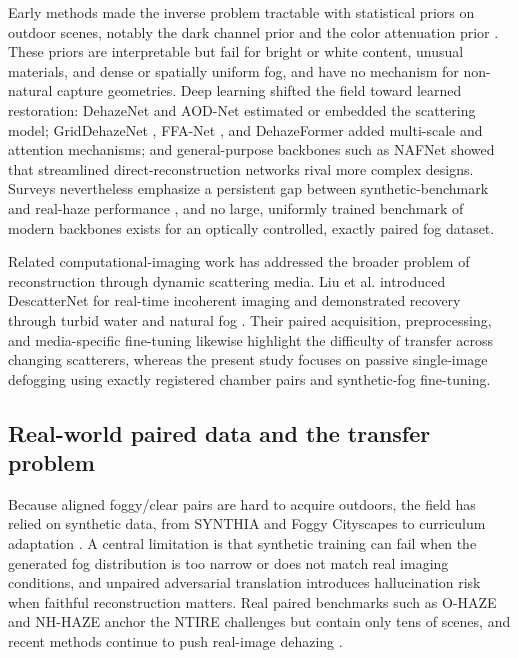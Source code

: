 \documentclass{optica-article}
\begin{document}
Early methods made the inverse problem tractable with statistical
priors on outdoor scenes, notably the dark channel prior
\cite{he2010single} and the color attenuation prior
\cite{zhu2014single}. These priors are interpretable but fail for
bright or white content, unusual materials, and dense or
spatially uniform fog, and have no mechanism for non-natural
capture geometries. Deep learning shifted the field toward learned
restoration: DehazeNet \cite{cai2016dehazenet} and AOD-Net
\cite{li2017aod} estimated or embedded the scattering model;
GridDehazeNet \cite{liu2019griddehazenet}, FFA-Net
\cite{qin2020ffa}, and DehazeFormer \cite{song2023dehazeformer}
added multi-scale and attention mechanisms; and general-purpose
backbones such as NAFNet \cite{chen2022simple} showed that
streamlined direct-reconstruction networks rival more complex
designs. Surveys nevertheless emphasize a persistent gap between
synthetic-benchmark and real-haze performance
\cite{gui2021comprehensive}, and no large, uniformly trained
benchmark of modern backbones exists for an optically controlled,
exactly paired fog dataset.

Related computational-imaging work has addressed the broader problem
of reconstruction through dynamic scattering media. Liu et al.
introduced DescatterNet for real-time incoherent imaging and demonstrated
recovery through turbid water and natural fog
\cite{liu2024dynamic_scattering}. Their paired acquisition, preprocessing,
and media-specific fine-tuning likewise highlight the difficulty of
transfer across changing scatterers, whereas the present study focuses on
passive single-image defogging using exactly registered chamber pairs and
synthetic-fog fine-tuning.
 
\subsection{Real-world paired data and the transfer problem}
 
Because aligned foggy/clear pairs are hard to acquire outdoors, the
field has relied on synthetic data, from SYNTHIA
\cite{ros2016synthia} and Foggy Cityscapes
\cite{sakaridis2018semantic} to curriculum adaptation
\cite{sakaridis2018model}. A central limitation is that synthetic training can fail when the generated fog distribution is too narrow or does not match real imaging conditions, and unpaired adversarial translation \cite{isola2017pix2pix,zhu2017unpaired} introduces hallucination
risk when faithful reconstruction matters. Real paired benchmarks
such as O-HAZE \cite{ancuti2018ohaze} and NH-HAZE
\cite{ancuti2020nhhaze} anchor the NTIRE challenges
\cite{ancuti2021ntire,histofusionnet2026} but contain only tens of
scenes, and recent methods continue to push real-image dehazing
\cite{chen2024pttd,chen2025dehazexl}.
 
\end{document}
